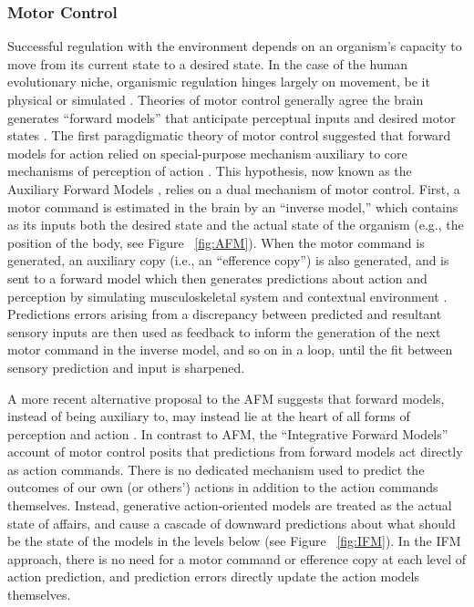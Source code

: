 \begin{CJK}{UTF8}{gbsn}
\subsubsection{Motor Control}
Successful regulation with the environment depends on an organism's capacity to move from its current state to a desired state.  In the case of the human evolutionary niche, organismic regulation hinges largely on movement, be it physical or simulated \citep{Wolpert1995}.  Theories of motor control generally agree the brain generates ``forward models'' that anticipate perceptual inputs and desired motor states \citep{Pickering2014}. The first paragdigmatic theory of motor control suggested that forward models for action relied on special-purpose mechanism auxiliary to core mechanisms of perception of action \citep{Wolpert1997}.  This hypothesis, now known as the Auxiliary Forward Models \citep[AFM, see][]{Pickering2014}, relies on a dual mechanism of motor control.  First, a motor command is estimated in the brain by an ``inverse model,'' which contains as its inputs both the desired state and the actual state of the organism (e.g., the position of the body, see Figure ~\ref{fig:AFM}).  When the motor command is generated, an auxiliary copy (i.e., an ``efference copy'') is also generated, and is sent to a forward model which then generates predictions about action and perception by simulating musculoskeletal system and contextual environment \citep{Wolpert1995,Blakemore1998,Flanagan2003}.  Predictions errors arising from a discrepancy between predicted and resultant sensory inputs are then used as feedback to inform the generation of the next motor command in the inverse model, and so on in a loop, until the fit between sensory prediction and input is sharpened.

A more recent alternative proposal to the AFM suggests that forward models, instead of being auxiliary to, may instead lie at the heart of all forms of perception and action \citep{Friston2010}.  In contrast to AFM, the ``Integrative Forward Models'' account of motor control \citep[IFM, see][]{Pickering2014} posits that predictions from forward models act directly as action commands.  There is no dedicated mechanism used to predict the outcomes of our own (or others’) actions in addition to the action commands themselves.  Instead, generative action-oriented models are treated as the actual state of affairs, and cause a cascade of downward predictions about what should be the state of the models in the levels below (see Figure ~\ref{fig:IFM}).  In the IFM approach, there is no need for a motor command or efference copy at each level of action prediction, and prediction errors directly update the action models themselves.




\end{CJK}
